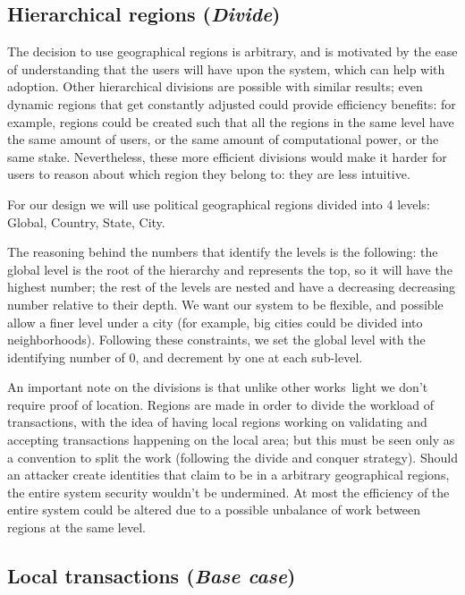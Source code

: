 \subsection{Hierarchical regions (\textit{Divide})}

The decision to use geographical regions is arbitrary, and is motivated by the
ease of understanding that the users will have upon the system, which can help
with adoption.  Other hierarchical divisions are possible with similar results;
even dynamic regions that get constantly adjusted could provide efficiency
benefits: for example, regions could be created such that all the regions in
the same level have the same amount of users, or the same amount of
computational power, or the same stake.  Nevertheless, these more efficient
divisions would make it harder for users to reason about which region they
belong to: they are less intuitive.

For our design we will use political geographical regions divided into 4
levels: Global, Country, State, City.

The reasoning behind the numbers that identify the levels is the following: the
global level is the root of the hierarchy and represents the top, so it will
have the highest number; the rest of the levels are nested and have a
decreasing decreasing number relative to their depth.  We want our system to be
flexible, and possible allow a finer level under a city (for example, big
cities could be divided into neighborhoods).  Following these constraints, we
set the global level with the identifying number of 0, and decrement by one at
each sub-level.

An important note on the divisions is that unlike other
works~\cite{unchain}light we don't require proof of location.  Regions are made
in order to divide the workload of transactions, with the idea of having local
regions working on validating and accepting transactions happening on the local
area; but this must be seen only as a convention to split the work (following
the divide and conquer strategy).  Should an attacker create identities that
claim to be in a arbitrary geographical regions, the entire system security
wouldn't be undermined.  At most the efficiency of the entire system could be
altered due to a possible unbalance of work between regions at the same level.

\subsection{Local transactions (\textit{Base case})}

